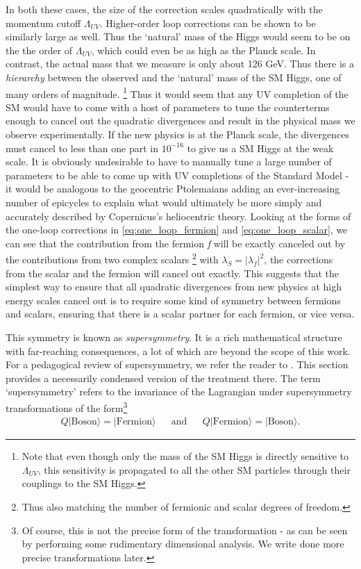 \strictpagecheck
In both these cases, the size of the correction scales quadratically with the momentum cutoff $\Lambda_{UV}$. Higher-order loop corrections can be shown to be similarly large as well. Thus the `natural' mass of the Higgs would seem to be on the the order of $\Lambda_{UV}$, which could even be as high as the Planck scale. In contrast, the actual mass that we measure is only about 126 GeV. Thus there is a \emph{hierarchy} between the observed and the `natural' mass of the SM Higgs, one of many orders of magnitude. \footnote{Note that even though only the mass of the SM Higgs is directly sensitive to $\Lambda_{UV}$, this sensitivity is propagated to all the other SM particles through their couplings to the SM Higgs.}
Thus it would seem that any UV completion of the SM would have to come with a host of parameters to tune the counterterms enough to cancel out the quadratic divergences and result in the physical mass we observe experimentally. If the new physics is at the Planck scale, the divergences must cancel to less than one part in $10^{-16}$ to give us a SM Higgs at the weak scale.
It is obviously undesirable to have to manually tune a large number of parameters to be able to come up with UV completions of the Standard Model - it would be analogous to the geocentric Ptolemaians adding an ever-increasing number of epicycles to explain what would ultimately be more simply and accurately described by Copernicus's heliocentric theory. 
Looking at the forms of the one-loop corrections in \eqref{eq:one_loop_fermion} and \eqref{eq:one_loop_scalar}, we can see that the contribution from the fermion \emph{f} will be exactly canceled out by the contributions from two complex scalars \footnote{Thus also matching the number of fermionic and scalar degrees of freedom.} with $\lambda_S = |\lambda_f|^2$, the corrections from the scalar and the fermion will cancel out exactly. This suggests that the simplest way to ensure that all quadratic divergences from new physics at high energy scales cancel out is to require some kind of symmetry between fermions and scalars, ensuring that there is a scalar partner for each fermion, or vice versa.

This symmetry is known as \emph{supersymmetry}. It is a rich mathematical structure with far-reaching consequences, a lot of which are beyond the scope of this work. For a pedagogical review of supersymmetry, we refer the reader to \citep{Martin1997}. This section provides a necessarily condensed version of the treatment there. 
The term `supersymmetry' refers to the invariance of the Lagrangian under supersymmetry transformations of the form\footnote{Of course, this is not the precise form of the transformation - as can be seen by performing some rudimentary dimensional analysis. We write done more precise transformations later.}
\begin{align*}
  Q|\text{Boson}\rangle = |\text{Fermion}\rangle &&\text{and}&& Q|\text{Fermion}\rangle = |\text{Boson}\rangle.
\end{align*}

